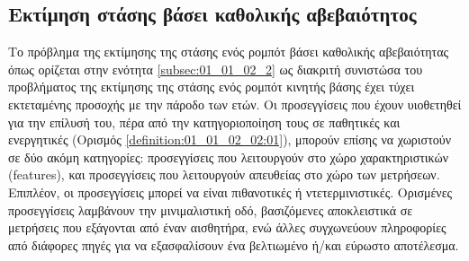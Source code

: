 \subsection{Εκτίμηση στάσης βάσει καθολικής αβεβαιότητος}
\label{subsection:02_03_02:01}

Το πρόβλημα της εκτίμησης της στάσης ενός ρομπότ βάσει καθολικής αβεβαιότητας
όπως ορίζεται στην ενότητα \ref{subsec:01_01_02_2} ως διακριτή συνιστώσα του
προβλήματος της εκτίμησης της στάσης ενός ρομπότ κινητής βάσης έχει τύχει
εκτεταμένης προσοχής με την πάροδο των ετών. Οι προσεγγίσεις που έχουν
υιοθετηθεί για την επίλυσή του, πέρα από την κατηγοριοποίηση τους σε παθητικές
και ενεργητικές (Ορισμός \ref{definition:01_01_02_02:01}), μπορούν επίσης να
χωριστούν σε δύο ακόμη κατηγορίες: προσεγγίσεις που λειτουργούν στο χώρο
χαρακτηριστικών (features), και προσεγγίσεις που λειτουργούν απευθείας στο χώρο
των μετρήσεων. Επιπλέον, οι προσεγγίσεις μπορεί να είναι πιθανοτικές ή
ντετερμινιστικές. Ορισμένες προσεγγίσεις λαμβάνουν την μινιμαλιστική οδό,
βασιζόμενες αποκλειστικά σε μετρήσεις που εξάγονται από έναν αισθητήρα, ενώ
άλλες συγχωνεύουν πληροφορίες από διάφορες πηγές για να εξασφαλίσουν ένα
βελτιωμένο ή/και εύρωστο αποτέλεσμα.

